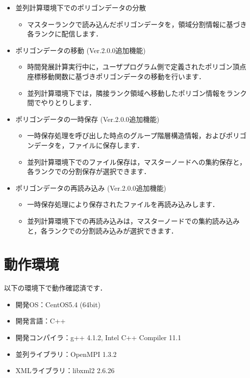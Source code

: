 {\begin{itemize}
 \item 並列計算環境下でのポリゴンデータの分散
  \begin{itemize}
   \item マスターランクで読み込んだポリゴンデータを，領域分割情報に基づき各ランクに配信します．
  \end{itemize}
  \vspace{2mm}
  
 \item ポリゴンデータの移動 (Ver.2.0.0追加機能)
  \begin{itemize}
   \item 時間発展計算実行中に，ユーザプログラム側で定義されたポリゴン頂点座標移動関数に基づきポリゴンデータの移動を行います．
   \item 並列計算環境下では，隣接ランク領域へ移動したポリゴン情報をランク間でやりとりします．
  \end{itemize}
  \vspace{2mm}
  
 \item ポリゴンデータの一時保存 (Ver.2.0.0追加機能)
  \begin{itemize}
   \item 一時保存処理を呼び出した時点のグループ階層構造情報，およびポリゴンデータを，ファイルに保存します．
   \item 並列計算環境下でのファイル保存は，マスターノードへの集約保存と，各ランクでの分割保存が選択できます．
  \end{itemize}
  \vspace{2mm}
  
 \item ポリゴンデータの再読み込み  (Ver.2.0.0追加機能)
  \begin{itemize}
   \item 一時保存処理により保存されたファイルを再読み込みします．
   \item 並列計算環境下での再読み込みは，マスターノードでの集約読み込みと，各ランクでの分割読み込みが選択できます．
  \end{itemize}
\end{itemize}

%
\pagebreak
%
\section{動作環境}
以下の環境下で動作確認済です．

\begin{itemize}
 \item 開発OS：CentOS5.4 (64bit)
 \item 開発言語：C++
 \item 開発コンパイラ：g++ 4.1.2, Intel C++ Compiler 11.1
 \item 並列ライブラリ：OpenMPI 1.3.2
 \item XMLライブラリ：libxml2 2.6.26
\end{itemize}

}
